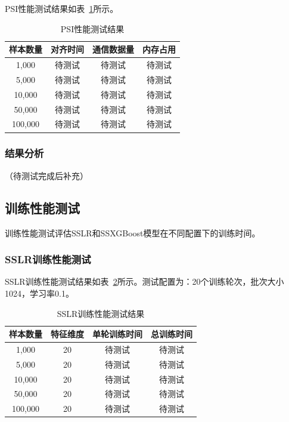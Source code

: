PSI性能测试结果如表~\ref{tab:psi-perf}所示。

\begin{table}[htbp]
    \centering
    \caption{PSI性能测试结果}
    \label{tab:psi-perf}
    \begin{tabular}{cccc}
        \toprule
        \textbf{样本数量} & \textbf{对齐时间} & \textbf{通信数据量} & \textbf{内存占用} \\
        \midrule
        1,000 & 待测试 & 待测试 & 待测试 \\
        5,000 & 待测试 & 待测试 & 待测试 \\
        10,000 & 待测试 & 待测试 & 待测试 \\
        50,000 & 待测试 & 待测试 & 待测试 \\
        100,000 & 待测试 & 待测试 & 待测试 \\
        \bottomrule
    \end{tabular}
\end{table}

\subsubsection{结果分析}

（待测试完成后补充）

\subsection{训练性能测试}

训练性能测试评估SSLR和SSXGBoost模型在不同配置下的训练时间。

\subsubsection{SSLR训练性能测试}

SSLR训练性能测试结果如表~\ref{tab:sslr-perf}所示。测试配置为：20个训练轮次，批次大小1024，学习率0.1。

\begin{table}[htbp]
    \centering
    \caption{SSLR训练性能测试结果}
    \label{tab:sslr-perf}
    \begin{tabular}{cccc}
        \toprule
        \textbf{样本数量} & \textbf{特征维度} & \textbf{单轮训练时间} & \textbf{总训练时间} \\
        \midrule
        1,000 & 20 & 待测试 & 待测试 \\
        5,000 & 20 & 待测试 & 待测试 \\
        10,000 & 20 & 待测试 & 待测试 \\
        50,000 & 20 & 待测试 & 待测试 \\
        100,000 & 20 & 待测试 & 待测试 \\
        \bottomrule
    \end{tabular}
\end{table}

